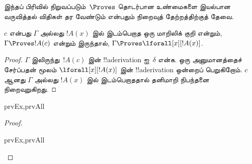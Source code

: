 \documentclass[../../../include/open-logic-section]{subfiles}
\begin{document}


\begin{explain}
  இந்தப் பிரிவில் நிறுவப்படும்~$\Proves$ தொடர்பான உண்மைகளை இயல்பான வருவித்தல்
  விதிகள் தர வேண்டும் என்பதும் நிறைவுத் தேற்றத்திற்குத் தேவை.
\end{explain}

\begin{thm}
 $c$ என்பது $\Gamma$ அல்லது $!A(x)$ இல்
இடம்பெறாத ஒரு மாறிலிக் குறி என்றும், $\Gamma \Proves !A(c)$ என்றும் இருந்தால்,
$\Gamma \Proves \lforall[x][!A(x)]$.
\end{thm}

\begin{proof}
$\Gamma$ இலிருந்து~$!A(c)$ இன் !!a{derivation} ஐ~$\delta$ என்க. ஒரு
\Intro{\lforall} அனுமானத்தைச் சேர்ப்பதன் மூலம்
$\lforall[x][!A(x)]$ இன் !!a{derivation} ஒன்றைப் பெறுகிறோம். $c$ ஆனது
$\Gamma$ அல்லது $!A(x)$ இல் இடம்பெறாததால் தனிமாறி நிபந்தனை நிறைவுறுகிறது.
\end{proof}

\begin{prop}
\begin{tagenumerate}{prvEx,prvAll}

\end{tagenumerate}
\end{prop}

\begin{proof}
\begin{tagenumerate}{prvEx,prvAll}

\end{tagenumerate}
\end{proof}
\end{document}
